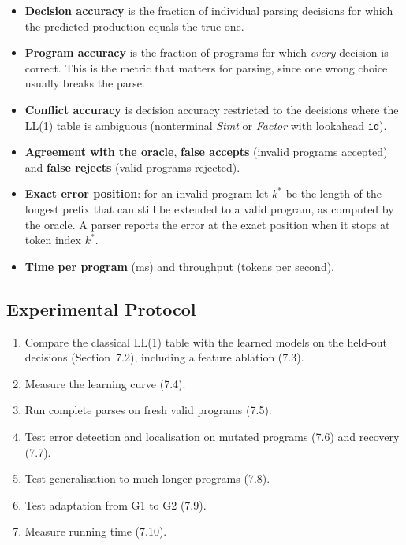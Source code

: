 \documentclass[12pt,a4paper]{article}
\newcommand{\ntm}[1]{\textit{#1}}
\newcommand{\tok}[1]{\texttt{#1}}
\begin{document}
\begin{itemize}
    \item \textbf{Decision accuracy} is the fraction of individual parsing
    decisions for which the predicted production equals the true one.
    \item \textbf{Program accuracy} is the fraction of programs for which
    \emph{every} decision is correct. This is the metric that matters for
    parsing, since one wrong choice usually breaks the parse.
    \item \textbf{Conflict accuracy} is decision accuracy restricted to the
    decisions where the LL(1) table is ambiguous (nonterminal \ntm{Stmt} or
    \ntm{Factor} with lookahead \tok{id}).
    \item \textbf{Agreement with the oracle}, \textbf{false accepts} (invalid
    programs accepted) and \textbf{false rejects} (valid programs rejected).
    \item \textbf{Exact error position}: for an invalid program let $k^{*}$ be
    the length of the longest prefix that can still be extended to a valid
    program, as computed by the oracle. A parser reports the error at the exact
    position when it stops at token index $k^{*}$.
    \item \textbf{Time per program} (ms) and throughput (tokens per second).
\end{itemize}

\subsection{Experimental Protocol}

\begin{enumerate}
    \item Compare the classical LL(1) table with the learned models on the
    held-out decisions (Section~7.2), including a feature ablation (7.3).
    \item Measure the learning curve (7.4).
    \item Run complete parses on fresh valid programs (7.5).
    \item Test error detection and localisation on mutated programs (7.6)
    and recovery (7.7).
    \item Test generalisation to much longer programs (7.8).
    \item Test adaptation from G1 to G2 (7.9).
    \item Measure running time (7.10).
\end{enumerate}
\end{document}
